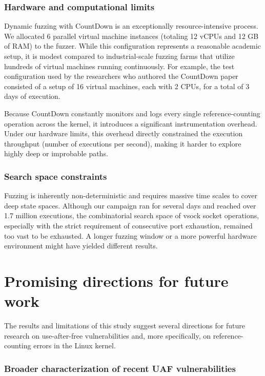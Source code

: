 \subsubsection{Hardware and computational limits}
Dynamic fuzzing with CountDown is an exceptionally resource-intensive process. We allocated 6 parallel virtual machine instances (totaling 12 vCPUs and 12 GB of RAM) to the fuzzer. While this configuration represents a reasonable academic setup, it is modest compared to industrial-scale fuzzing farms that utilize hundreds of virtual machines running continuously. For example, the test configuration used by the researchers who authored the CountDown paper \cite{bib:countdown} consisted of a setup of 16 virtual machines, each with 2 CPUs, for a total of 3 days of execution.

Because CountDown constantly monitors and logs every single reference-counting operation across the kernel, it introduces a significant instrumentation overhead. Under our hardware limits, this overhead directly constrained the execution throughput (number of executions per second), making it harder to explore highly deep or improbable paths.

\subsubsection{Search space constraints}
Fuzzing is inherently non-deterministic and requires massive time scales to cover deep state spaces. Although our campaign ran for several days and reached over 1.7 million executions, the combinatorial search space of vsock socket operations, especially with the strict requirement of consecutive port exhaustion, remained too vast to be exhausted. A longer fuzzing window or a more powerful hardware environment might have yielded different results.

\section{Promising directions for future work}

The results and limitations of this study suggest several directions for future research on use-after-free vulnerabilities and, more specifically, on reference-counting errors in the Linux kernel.

\subsubsection{Broader characterization of recent UAF vulnerabilities}

